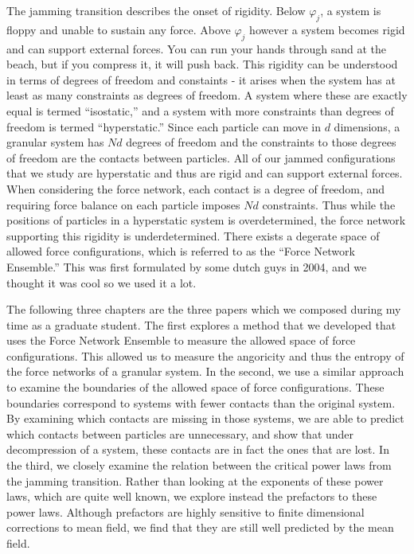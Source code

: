 The jamming transition describes the onset of rigidity. Below $\varphi_j$, a system is floppy and unable to sustain any force. Above $\varphi_j$ however a system becomes rigid and can support external forces. You can run your hands through sand at the beach, but if you compress it, it will push back. This rigidity can be understood in terms of degrees of freedom and constaints - it arises when the system has at least as many constraints as degrees of freedom. A system where these are exactly equal is termed ``isostatic,'' and a system with more constraints than degrees of freedom is termed ``hyperstatic.'' Since each particle can move in $d$ dimensions, a granular system has $Nd$ degrees of freedom and the constraints to those degrees of freedom are the contacts between particles. All of our jammed configurations that we study are hyperstatic and thus are rigid and can support external forces. When considering the force network, each contact is a degree of freedom, and requiring force balance on each particle imposes $Nd$ constraints. Thus while the positions of particles in a hyperstatic system is overdetermined, the force network supporting this rigidity is underdetermined. There exists a degerate space of allowed force configurations, which is referred to as the ``Force Network Ensemble.'' This was first formulated by some dutch guys in 2004, and we thought it was cool so we used it a lot. 

The following three chapters are the three papers which we composed during my time as a graduate student. The first explores a method that we developed that uses the Force Network Ensemble to measure the allowed space of force configurations. This allowed us to measure the angoricity and thus the entropy of the force networks of a granular system. In the second, we use a similar approach to examine the boundaries of the allowed space of force configurations. These boundaries correspond to systems with fewer contacts than the original system. By examining which contacts are missing in those systems, we are able to predict which contacts between particles are unnecessary, and show that under decompression of a system, these contacts are in fact the ones that are lost. In the third, we closely examine the relation between the critical power laws from the jamming transition. Rather than looking at the exponents of these power laws, which are quite well known, we explore instead the prefactors to these power laws. Although prefactors are highly sensitive to finite dimensional corrections to mean field, we find that they are still well predicted by the mean field.
